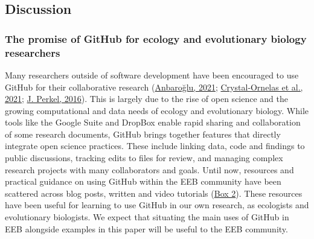 \hypertarget{discussion}{%
\subsection{Discussion}\label{discussion}}

\hypertarget{the-promise-of-github-for-ecology-and-evolutionary-biology-researchers}{%
\subsubsection{The promise of GitHub for ecology and evolutionary biology researchers}\label{the-promise-of-github-for-ecology-and-evolutionary-biology-researchers}}

Many researchers outside of software development have been encouraged to use GitHub for their collaborative research (\protect\hyperlink{ref-UsTxAq4f}{Anbaroğlu, 2021}; \protect\hyperlink{ref-1Du6fzB8g}{Crystal‐Ornelas et al., 2021}; \protect\hyperlink{ref-10ghgV3S8}{J. Perkel, 2016}).
This is largely due to the rise of open science and the growing computational and data needs of ecology and evolutionary biology.
While tools like the Google Suite and DropBox enable rapid sharing and collaboration of some research documents, GitHub brings together features that directly integrate open science practices.
These include linking data, code and findings to public discussions, tracking edits to files for review, and managing complex research projects with many collaborators and goals.
Until now, resources and practical guidance on using GitHub within the EEB community have been scattered across blog posts, written and video tutorials (\protect\hyperlink{tips}{Box 2}).
These resources have been useful for learning to use GitHub in our own research, as ecologists and evolutionary biologists.
We expect that situating the main uses of GitHub in EEB alongside examples in this paper will be useful to the EEB community.

